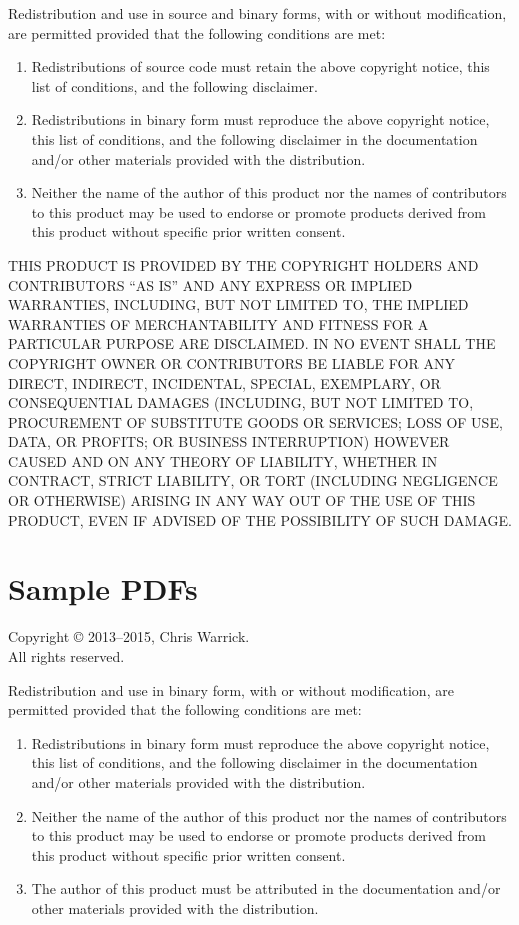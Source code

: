 \documentclass[a4paper,english]{report}
\numberwithin{equation}{section}
\begin{document}
Redistribution and use in source and binary forms, with or without
modification, are permitted provided that the following conditions are
met:

\begin{enumerate}
\item Redistributions of source code must retain the above copyright
   notice, this list of conditions, and the following disclaimer.

\item Redistributions in binary form must reproduce the above copyright
   notice, this list of conditions, and the following disclaimer in the
   documentation and/or other materials provided with the distribution.

\item Neither the name of the author of this product nor the names of
   contributors to this product may be used to endorse or promote
   products derived from this product without specific prior written
   consent.
\end{enumerate}

THIS PRODUCT IS PROVIDED BY THE COPYRIGHT HOLDERS AND CONTRIBUTORS
“AS IS” AND ANY EXPRESS OR IMPLIED WARRANTIES, INCLUDING, BUT NOT
LIMITED TO, THE IMPLIED WARRANTIES OF MERCHANTABILITY AND FITNESS FOR
A PARTICULAR PURPOSE ARE DISCLAIMED.  IN NO EVENT SHALL THE COPYRIGHT
OWNER OR CONTRIBUTORS BE LIABLE FOR ANY DIRECT, INDIRECT, INCIDENTAL,
SPECIAL, EXEMPLARY, OR CONSEQUENTIAL DAMAGES (INCLUDING, BUT NOT
LIMITED TO, PROCUREMENT OF SUBSTITUTE GOODS OR SERVICES; LOSS OF USE,
DATA, OR PROFITS; OR BUSINESS INTERRUPTION) HOWEVER CAUSED AND ON ANY
THEORY OF LIABILITY, WHETHER IN CONTRACT, STRICT LIABILITY, OR TORT
(INCLUDING NEGLIGENCE OR OTHERWISE) ARISING IN ANY WAY OUT OF THE USE
OF THIS PRODUCT, EVEN IF ADVISED OF THE POSSIBILITY OF SUCH DAMAGE.

\pagebreak

\section{Sample PDFs}

Copyright © 2013–2015, Chris Warrick. \\
All rights reserved.

Redistribution and use in binary form, with or without modification,
are permitted provided that the following conditions are met:

\begin{enumerate}
\item Redistributions in binary form must reproduce the above copyright
   notice, this list of conditions, and the following disclaimer in the
   documentation and/or other materials provided with the distribution.
\item Neither the name of the author of this product nor the names of
   contributors to this product may be used to endorse or promote
   products derived from this product without specific prior written
   consent.
\item The author of this product must be attributed in the documentation
   and/or other materials provided with the distribution.
\end{enumerate}
\end{document}
